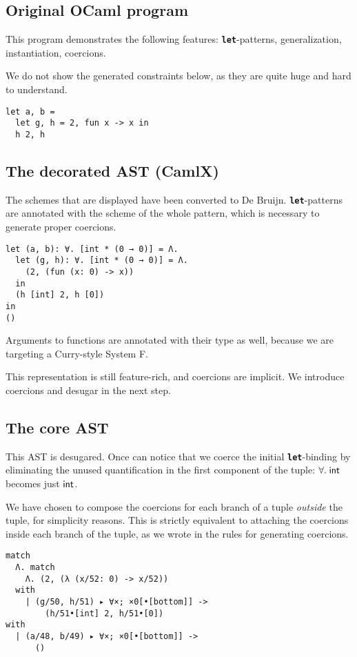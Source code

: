 \documentclass[10pt,a4paper,twoside,titlepage,twocolumn]{article}
\newcommand{\code}[1]{\textbf{\texttt{#1}}}
\begin{document}
\subsection{Original OCaml program}

This program demonstrates the following features: \code{let}-patterns,
generalization, instantiation, coercions.

We do not show the generated constraints below, as they are quite huge and hard
to understand.

\begin{verbatim}
let a, b =
  let g, h = 2, fun x -> x in
  h 2, h
\end{verbatim}

\subsection{The decorated AST (CamlX)}

The schemes that are displayed have been converted to De Bruijn.
\code{let}-patterns are annotated with the scheme of the whole pattern, which is
necessary to generate proper coercions.

\begin{verbatim}
let (a, b): ∀. [int * (0 → 0)] = Λ.
  let (g, h): ∀. [int * (0 → 0)] = Λ.
    (2, (fun (x: 0) -> x))
  in
  (h [int] 2, h [0])
in
()
\end{verbatim}

Arguments to functions are annotated with their type as well, because we are
targeting a Curry-style System F.

This representation is still feature-rich, and coercions are implicit. We
introduce coercions and desugar in the next step.

\subsection{The core AST}

This AST is desugared. Once can notice that we coerce the initial
\code{let}-binding by eliminating the unused quantification in the first
component of the tuple: $\forall.\;\text{\textsf{int}}$ becomes just $\text{\textsf{int}}$.

We have chosen to compose the coercions for each branch of a tuple
\emph{outside} the tuple, for simplicity reasons. This is strictly equivalent to
attaching the coercions inside each branch of the tuple, as we wrote in the
rules for generating coercions.

\begin{verbatim}
match
  Λ. match
    Λ. (2, (λ (x/52: 0) -> x/52))
  with
    | (g/50, h/51) ▸ ∀×; ×0[•[bottom]] ->
        (h/51•[int] 2, h/51•[0])
with
  | (a/48, b/49) ▸ ∀×; ×0[•[bottom]] ->
      ()
\end{verbatim}
\end{document}

